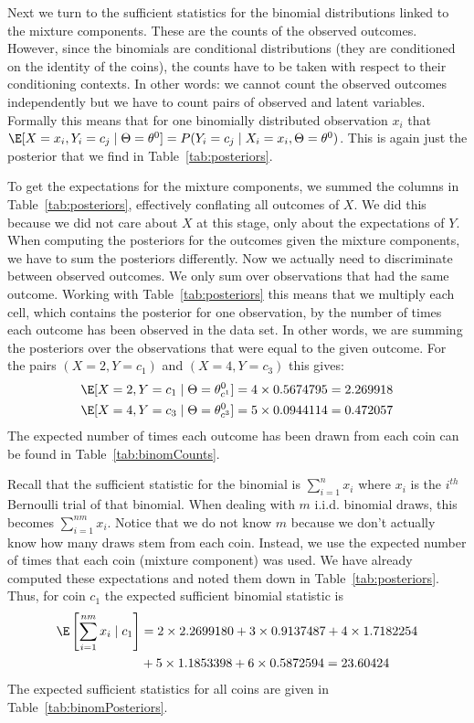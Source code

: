 Next we turn to the sufficient statistics for the binomial distributions linked to the mixture components. These are the counts of the observed outcomes. However,
since the binomials are conditional distributions (they are conditioned on the identity of the coins), the counts have to be taken with respect to their conditioning
contexts. In other words: we cannot count the observed outcomes independently but we have to count pairs of observed and latent variables. Formally this means that 
for one binomially distributed observation $ x_{i} $ that $ \E[X=x_{i},Y_{i}=c_{j} \mid \Theta=\theta^{0}] = P(Y_{i}=c_{j} \mid X_{i}=x_{i}, \Theta=\theta^{0}) $. This is again
just the posterior that we find in Table~\ref{tab:posteriors}. 

To get the expectations for the mixture components, we summed the columns in Table~\ref{tab:posteriors}, effectively conflating all outcomes of $ X $. We did this
because we did not care about $ X $ at this stage, only about the expectations of $ Y $. When computing the posteriors for the outcomes given the mixture components,
we have to sum the posteriors differently. Now we actually need to discriminate between
observed outcomes. We only sum over observations that had the same outcome. Working with Table~\ref{tab:posteriors} this means that we multiply each
cell, which contains the posterior for one observation, by the number of times each outcome has been observed in the data set. In other words, we are summing
the posteriors over the observations that were equal to the given outcome. For the pairs $ (X=2,Y=c_{1}) $
and $ (X=4,Y = c_{3}) $ this gives:
\begin{align}
\E[X=2,Y=c_{1} \mid \Theta=\theta^{0}_{c^{1}}] = 4 \times 0.5674795 = 2.269918 \\
\E[X=4,Y=c_{3} \mid \Theta=\theta^{0}_{c^{3}}] = 5 \times 0.0944114 = 0.472057
\end{align} 
The expected number of times each outcome has been drawn from each coin can be found in Table~\ref{tab:binomCounts}. 

Recall that the sufficient statistic for the binomial is 
$ \sum_{i=1}^{n} x_{i} $ where $ x_{i} $ is the $ i^{th} $ Bernoulli trial of that binomial. 
When dealing with $ m $ i.i.d. binomial draws, this becomes $ \sum_{i=1}^{nm} x_{i} $. Notice that we do not
know $ m $ because we don't actually know how many draws stem from each coin. Instead, we use the expected number of times
that each coin (mixture component) was used. We have already computed these expectations and noted them down in Table~\ref{tab:posteriors}. Thus, for coin $ c_{1} $
the expected sufficient binomial statistic is
\begin{align}
\E\left[\sum_{i=1}^{nm} x_{i}\mid c_{1}\right] &= 2 \times 2.2699180 + 3 \times 0.9137487+ 4 \times 1.7182254  \\
&+ 5 \times 1.1853398 + 6 \times 0.5872594 = 23.60424 \nonumber
\end{align}
The expected sufficient statistics for all coins are given in Table~\ref{tab:binomPosteriors}.

